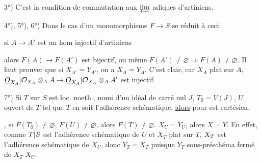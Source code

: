 
3°) C'est la condition de commutation aux $\varprojlim$ adiques d'artiniens.

4°), 5°), 6°) Dans le cas d'un monomorphisme $F\to S$ se réduit à ceci


si $A\to A'$ est un hom injectif d'artiniens 

alors $F(A)\to F(A')$ est bijectif, ou même $F(A')\ne\varnothing\Rightarrow F(A)\ne\varnothing$. Il faut prouver que si $X_{A'}=Y_{A'}$, on a $X_A=Y_A$. C'est clair, car $X_A$  plat sur $A$, $\underline O_{X_A}|\mathcal O_{X_A}\otimes_A A\to\underline O_{X_A}|\mathcal O_{X_A}\otimes_A A'$ est injectif.


7°) Si $T$ sur $S$ est  loc. noeth., muni d'un idéal de carré nul $J$, $T_0=V(J)$, $U$ ouvert de $T$ tel que $T$ en soit l'adhérence schématique, \uline{alors} pour 
est cartésien.



, si $F(T_0)\ne\varnothing$, $F(U)\ne\varnothing$, alors \deleted{$\unsure{\times}$} $F(T)\ne\varnothing$.   $X_U=Y_U$, alors $X=Y$. En effet, comme $T|S$ est l'adhérence schématique de $U$ et $X_T$ plat sur $T$, $X_{T}$ est l'adhérence schématique de $X_U$, donc  $Y_T=X_T$ puisque $Y_T$ sous-préschéma fermé de $X_T$  $X_U$.

